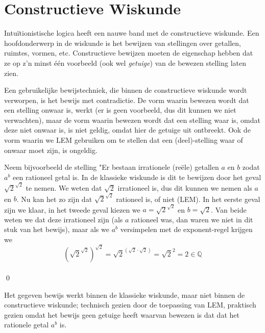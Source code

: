 \section{Constructieve Wiskunde}
Intu\"itionistische logica heeft een nauwe band met de constructieve wiskunde. Een hoofdonderwerp in de wiskunde is het bewijzen van stellingen over getallen, ruimtes, vormen, etc. Constructieve bewijzen moeten de eigenschap hebben dat ze op z'n minst \'e\'en voorbeeld (ook wel \emph{getuige}) van de bewezen stelling laten zien.

Een gebruikelijke bewijstechniek, die binnen de constructieve wiskunde wordt verworpen, is het bewijs met contradictie. De vorm waarin bewezen wordt dat een stelling onwaar is, werkt (er is geen voorbeeld, dus dit kunnen we niet verwachten), maar de vorm waarin bewezen wordt dat een stelling waar is, omdat deze niet onwaar is, is niet geldig, omdat hier de getuige uit ontbreekt. Ook de vorm waarin we LEM gebruiken om te stellen dat een (deel)-stelling waar of onwaar moet zijn, is ongeldig.

\begin{example}\label{ex:nonconstr}
Neem bijvoorbeeld de stelling "Er bestaan irrationele (re\"ele) getallen $a$ en $b$ zodat $a^b$ een rationeel getal is. In de klassieke wiskunde is dit te bewijzen door het geval $\sqrt{2}^{\sqrt{2}}$ te nemen. We weten dat $\sqrt{2}$ irrationeel is, dus dit kunnen we nemen als $a$ en $b$. Nu kan het zo zijn dat $\sqrt{2}^{\sqrt{2}}$ rationeel is, of niet (LEM). In het eerste geval zijn we klaar, in het tweede geval kiezen we $a = \sqrt{2}^{\sqrt{2}}$ en $b = \sqrt{2}$. Van beide weten we dat deze irrationeel zijn (als $a$ rationeel was, dan waren we niet in dit stuk van het bewijs), maar als we $a^b$ versimpelen met de exponent-regel krijgen we 
  $$\left(\sqrt{2}^{\sqrt{2}}\right)^{\sqrt{2}} = \sqrt{2}^{(\sqrt{2}\cdot\sqrt{2})} = \sqrt{2}^2 = 2 \in \mathbb{Q}$$\\
\hfill\qed
\end{example}

Het gegeven bewijs werkt binnen de klassieke wiskunde, maar niet binnen de constructieve wiskunde; technisch gezien door de toepassing van LEM, praktisch gezien omdat het bewijs geen getuige heeft waarvan bewezen is dat dat het rationele getal $a^b$ is.


